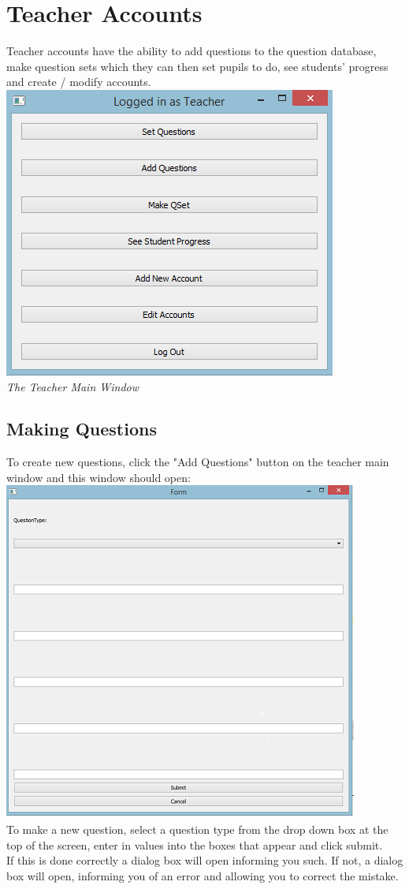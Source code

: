 \documentclass{report}
\begin{document}
\chapter{Teacher Accounts}
Teacher accounts have the ability to add questions to the question database, make question sets which they can then set pupils to do, see students' progress and create / modify accounts. \\
\includegraphics{teachermain}\\
\emph{The Teacher Main Window}
\section{Making Questions}
To create new questions, click the "Add Questions" button on the teacher main window and this window should open:\\
\includegraphics{MakeQ}\\
To make a new question, select a question type from the drop down box at the top of the screen, enter in values into the boxes that appear and click submit.\\
If this is done correctly a dialog box will open informing you such. If not, a dialog box will open, informing you of an error and allowing you to correct the mistake.\\
\end{document}
